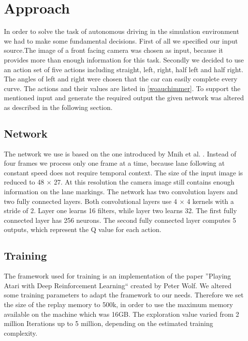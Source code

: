 
\section{Approach}

In order to solve the task of autonomous driving in the simulation environment we had to make some fundamental decisions. First of all we specified our input source.The image of a front facing camera was chosen as input, because it provides more than enough information for this task. Secondly we decided to use an action set of five actions including straight, left, right, half left and half right. The angles of left and right were chosen that the car can easily complete every curve. The actions and their values are listed in \ref{woauchimmer}. To support the mentioned input and generate the required output the given network was altered as described in the following section.

\subsection{Network}
The network we use is based on the one introduced by Mnih et al. \cite{Mnih13}. Instead of four frames we process only one frame at a time, because lane following at constant speed does not require temporal context. The size of the input image is reduced to 48 $\times$ 27. At this resolution the camera image still contains enough information on the lane markings. The network has two convolution layers and two fully connected layers. Both convolutional layers use 4 $\times$ 4 kernels with a stride of 2. Layer one learns 16 filters, while layer two learns 32. The first fully connected layer has 256 neurons. The second fully connected layer computes 5 outputs, which represent the Q value for each action.


\subsection{Training}
The framework used for training is an implementation of the paper ''Playing Atari with Deep Reinforcement Learning``  created by Peter Wolf. We altered some training parameters to adapt the framework to our needs. Therefore we set the size of the replay memory to 500k, in order to use the maximum memory available on the machine which was 16GB. The exploration value varied from 2 million Iterations up to 5 million, depending on the estimated training complexity. 

